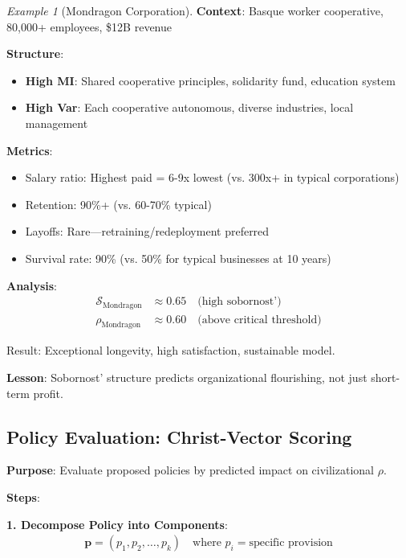 \documentclass[11pt,a4paper]{article}
\theoremstyle{definition}
\theoremstyle{remark}
\newtheorem{example}{Example}[section]
\begin{document}
\begin{small}
\begin{enumerate}
\begin{example}[Mondragon Corporation]
\textbf{Context}: Basque worker cooperative, 80,000+ employees, \$12B revenue

\textbf{Structure}:
\begin{itemize}
    \item \textbf{High MI}: Shared cooperative principles, solidarity fund, education system
    \item \textbf{High Var}: Each cooperative autonomous, diverse industries, local management
\end{itemize}

\textbf{Metrics}:
\begin{itemize}
    \item Salary ratio: Highest paid = 6-9x lowest (vs. 300x+ in typical corporations)
    \item Retention: 90\%+ (vs. 60-70\% typical)
    \item Layoffs: Rare—retraining/redeployment preferred
    \item Survival rate: 90\% (vs. 50\% for typical businesses at 10 years)
\end{itemize}

\textbf{Analysis}:
\begin{align}
\mathcal{S}_{\text{Mondragon}} &\approx 0.65 \quad \text{(high sobornost')} \\
\rho_{\text{Mondragon}} &\approx 0.60 \quad \text{(above critical threshold)}
\end{align}

Result: Exceptional longevity, high satisfaction, sustainable model.

\textbf{Lesson}: Sobornost' structure predicts organizational flourishing, not just short-term profit.
\end{example}

\subsection{Policy Evaluation: Christ-Vector Scoring}

\begin{protocol}
\textbf{Purpose}: Evaluate proposed policies by predicted impact on civilizational \(\rho\).

\textbf{Steps}:

\textbf{1. Decompose Policy into Components}:
\begin{align}
\mathbf{p} = (p_1, p_2, \ldots, p_k) \quad \text{where } p_i = \text{specific provision}
\end{align}


\end{protocol}
\end{enumerate}
\end{small}
\end{document}
